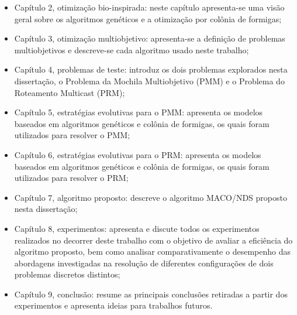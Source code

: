 \begin{itemize}  
	\item Capítulo 2, otimização bio-inspirada: neste capítulo apresenta-se uma visão geral sobre os algoritmos genéticos e a otimização por colônia de formigas;
	\item Capítulo 3, otimização multiobjetivo: apresenta-se a definição de problemas multiobjetivos e descreve-se cada algoritmo usado neste trabalho;
	\item Capítulo 4, problemas de teste: introduz os dois problemas explorados nesta dissertação, o Problema da Mochila Multiobjetivo (PMM) e o Problema do Roteamento Multicast (PRM);
	\item Capítulo 5, estratégias evolutivas para o \ac{PMM}: apresenta os modelos baseados em algoritmos genéticos e colônia de formigas, os quais foram utilizados para resolver o \ac{PMM};
	\item Capítulo 6, estratégias evolutivas para o \ac{PRM}: apresenta os modelos baseados em algoritmos genéticos e colônia de formigas, os quais foram utilizados para resolver o \ac{PRM};
	\item Capítulo 7, algoritmo proposto: descreve o algoritmo \ac{MACO/NDS} proposto nesta dissertação;
	\item Capítulo 8, experimentos: apresenta e discute todos os experimentos realizados no decorrer deste trabalho com o objetivo de avaliar a eficiência do algoritmo proposto, bem como analisar comparativamente o desempenho das abordagens investigadas na resolução de diferentes configurações de dois problemas discretos distintos;
	\item Capítulo 9, conclusão: resume as principais conclusões retiradas a partir dos experimentos e apresenta ideias para trabalhos futuros.
\end{itemize}